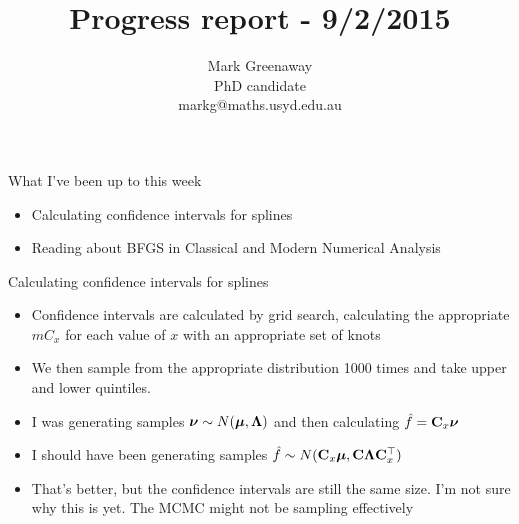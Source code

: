 \documentclass{beamer}
\title{Progress report - 9/2/2015}
\author{Mark Greenaway\\PhD candidate\\markg@maths.usyd.edu.au}
\begin{document}
\begin{frame}
\maketitle
\end{frame}


\begin{frame}{What I've been up to this week}
\begin{itemize}
\item Calculating confidence intervals for splines
\item Reading about BFGS in Classical and Modern Numerical Analysis
\end{itemize}
\end{frame}

\begin{frame}{Calculating confidence intervals for splines}
\begin{itemize}
\item Confidence intervals are calculated by grid search, calculating the
appropriate $mC_x$ for each value of $x$ with an appropriate set of knots
\item We then sample from the appropriate distribution 1000 times and take upper
and lower quintiles.
\item I was generating samples ${\boldsymbol \nu} \sim N({\boldsymbol \mu}, {\boldsymbol \Lambda})$ and then 
calculating $\hat{f} = {\bf C}_x {\boldsymbol \nu}$
\item I should have been generating samples $\hat{f} \sim N({\bf C}_x {\boldsymbol \mu}, {\bf C} {\boldsymbol \Lambda} {\bf C}_x^\top)$
\item That's better, but the confidence intervals are still the same size.
I'm not sure why this is yet. The MCMC might not be sampling effectively
\end{itemize}
\end{frame}
\end{document}
